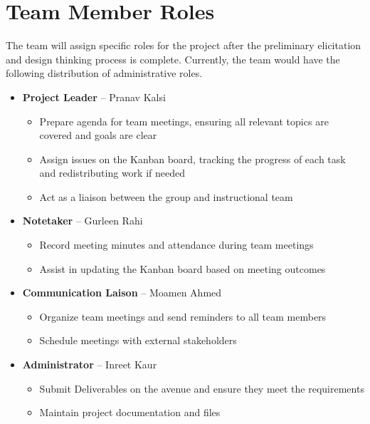 \documentclass{article}
\begin{document}

\section{Team Member Roles}
 
The team will assign specific roles for the project after the preliminary elicitation and design thinking process is complete. Currently, the team would have the following distribution of administrative roles.

\begin{itemize}
\item \textbf{Project Leader} -- Pranav Kalsi
\begin{itemize}
\item Prepare agenda for team meetings, ensuring all relevant topics are covered and goals are clear
\item Assign issues on the Kanban board, tracking the progress of each task and redistributing work if needed
\item Act as a liaison between the group and instructional team
\end{itemize}

\item \textbf{Notetaker} -- Gurleen Rahi
\begin{itemize}
\item Record meeting minutes and attendance during team meetings
\item Assist in updating the Kanban board based on meeting outcomes
\end{itemize}

\item \textbf{Communication Laison} -- Moamen Ahmed
\begin{itemize}
\item Organize team meetings and send reminders to all team members
\item Schedule meetings with external stakeholders
\end{itemize}

\item \textbf{Administrator} -- Inreet Kaur
\begin{itemize}
\item Submit Deliverables on the avenue and ensure they meet the requirements
\item Maintain project documentation and files
\end{itemize}
\end{itemize} 
\end{document}
